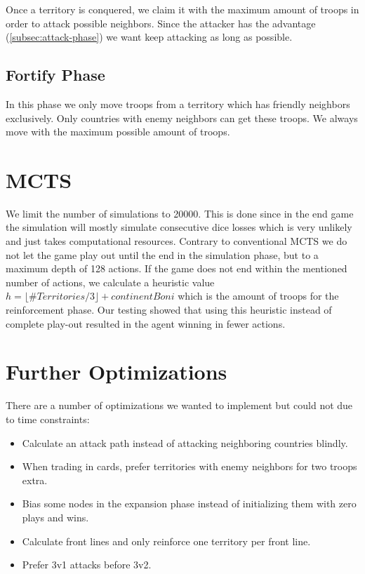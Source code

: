 \documentclass[conference]{IEEEtran}
\begin{document}
Once a territory is conquered, we claim it with the maximum amount of troops in order to attack possible neighbors.
Since the attacker has the advantage (\ref{subsec:attack-phase}) we want keep attacking as long as possible.

\subsection{Fortify Phase}
\label{subsec:foritfy-phase}

In this phase we only move troops from a territory which has friendly neighbors exclusively.
Only countries with enemy neighbors can get these troops.
We always move with the maximum possible amount of troops.

\section{MCTS}
\label{sec:mcts}

We limit the number of simulations to 20000.
This is done since in the end game the simulation will mostly simulate consecutive dice losses
which is very unlikely and just takes computational resources.
Contrary to conventional MCTS we do not let the game play out until the end in the simulation phase,
but to a maximum depth of 128 actions.
If the game does not end within the mentioned number of actions, we calculate a heuristic value
$h = \lfloor\# Territories/3\rfloor + continentBoni$
which is the amount of troops for the reinforcement phase.
Our testing showed that using this heuristic instead of complete play-out resulted in the agent winning in fewer actions.

\section{Further Optimizations}

There are a number of optimizations we wanted to implement but could not due to time constraints:
\begin{itemize}
    \item Calculate an attack path instead of attacking neighboring countries blindly.
    \item When trading in cards, prefer territories with enemy neighbors for two troops extra.
    \item Bias some nodes in the expansion phase instead of initializing them with zero plays and wins.
    \item Calculate front lines and only reinforce one territory per front line.
    \item Prefer 3v1 attacks before 3v2.
\end{itemize}



\end{document}
